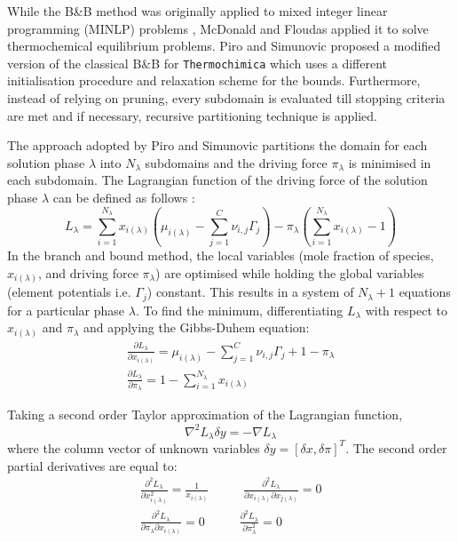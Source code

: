 	 While the B\&B method was originally applied to mixed integer linear programming (MINLP) problems \cite{Jaulin01}, McDonald and Floudas \cite{McDonald95} applied it to solve thermochemical equilibrium problems. Piro and Simunovic \cite{Piro16} proposed a modified version of the classical B\&B for \texttt{Thermochimica} which uses a different initialisation procedure and relaxation scheme for the bounds. Furthermore, instead of relying on pruning, every subdomain is evaluated till stopping criteria are met and if necessary, recursive partitioning technique is applied.
	 
	 The approach adopted by Piro and Simunovic \cite{Piro16} partitions the domain for each solution phase $\lambda$ into $N_\lambda$ subdomains and the driving force $\pi_\lambda$ is minimised in each subdomain. The Lagrangian function of the driving force of the solution phase $\lambda$ can be defined as follows \cite{Piro16}:
	 \begin{equation}
	 	L_\lambda = \sum_{i=1}^{N_\lambda} x_{i(\lambda)}\left( \mu_{i(\lambda)} - \sum_{j=1}^{C} \nu_{i,j}\Gamma_j \right) - \pi_{\lambda}\left( \sum_{i=1}^{N_\lambda} x_{i(\lambda)} -  1 \right)
	 \end{equation}
	 In the branch and bound method, the local variables (mole fraction of species, $x_{i(\lambda)}$, and driving force $\pi_{\lambda}$) are optimised while holding the global variables (element potentials i.e. $\Gamma_j$) constant. This results in a system of $N_{\lambda} + 1$ equations for a particular phase $\lambda$. To find the minimum, differentiating $L_\lambda$ with respect to $x_{i(\lambda)}$ and $\pi_{\lambda}$ and applying the Gibbs-Duhem equation:
	 \begin{gather}
	 	\frac{\partial L_\lambda}{\partial x_{i(\lambda)}} = \mu_{i(\lambda)} - \sum_{j=1}^{C} \nu_{i,j}\Gamma_j + 1 - \pi_{\lambda} \\
		\frac{\partial L_\lambda}{\partial \pi_{\lambda}} = 1- \sum_{i=1}^{N_\lambda} x_{i(\lambda)}
	 \end{gather}
	 
	 Taking a second order Taylor approximation of the Lagrangian function,
	 \begin{equation}
	 	\nabla^2 L_\lambda \delta y =  - \nabla L_\lambda
	 \end{equation}
	 where the column vector of unknown variables $\delta y = [\delta x, \delta \pi]^T$. The second order partial derivatives are equal to:
	  \begin{gather}
	 	\frac{\partial^2 L_\lambda}{\partial x_{i(\lambda)}^2} = \frac{1}{x_{i(\lambda)}} \mspace{50mu} \frac{\partial^2 L_\lambda}{\partial x_{i(\lambda)} \partial x_{j(\lambda)}} = 0 \\
		\frac{\partial^2 L_\lambda}{\partial \pi_{\lambda} \partial x_{i(\lambda)}} = 0 \mspace{50mu}  \frac{\partial^2 L_\lambda}{\partial \pi_{\lambda}^2} = 0
	 \end{gather}
	 
